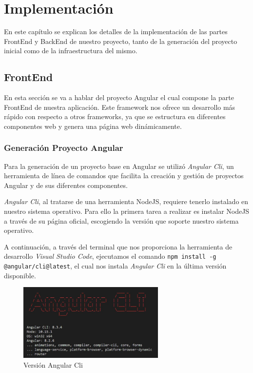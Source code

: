 \chapter{Implementación}
     En este capítulo se explican los detalles de la implementación de las partes FrontEnd y BackEnd de nuestro proyecto, tanto de la generación del proyecto inicial como de la infraestructura del mismo.
    
    
    \section{FrontEnd}
    En esta sección se va a hablar del proyecto Angular el cual compone la parte FrontEnd de nuestra aplicación. Este framework nos ofrece un desarrollo más rápido con respecto a otros frameworks, ya que se estructura en diferentes componentes web y genera una página web dinámicamente.
    \subsection{Generación Proyecto Angular}
    Para la generación de un proyecto base en Angular se utilizó \textit{Angular Cli}, un herramienta de línea de comandos que facilita la creación y gestión de proyectos Angular y de sus diferentes componentes.
    \newline
    
    \textit{Angular Cli}, al tratarse de  una herramienta NodeJS, requiere tenerlo instalado en nuestro sistema operativo. Para ello la primera tarea a realizar es instalar NodeJS a través de su página oficial\cite{nodejs}, escogiendo la versión que soporte nuestro sistema operativo.
 
    A continuación, a través del terminal que nos proporciona la herramienta de desarrollo \textit{Visual Studio Code}, ejecutamos el comando \texttt{npm install -g @angular/cli@latest}, el cual nos instala \textit{Angular Cli} en la última versión disponible.
    
    \begin{figure}[h]
    \centering
     \includegraphics[width=0.65\textwidth]{images/angularversion}
    \caption{Versión Angular Cli}
    \end{figure}
    
